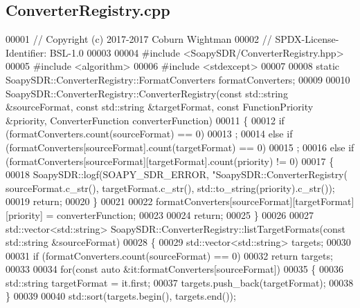 \subsection{Converter\+Registry.\+cpp}
\label{ConverterRegistry_8cpp_source}

\begin{DoxyCode}
00001 \textcolor{comment}{// Copyright (c) 2017-2017 Coburn Wightman}
00002 \textcolor{comment}{// SPDX-License-Identifier: BSL-1.0}
00003 
00004 \textcolor{preprocessor}{#include <SoapySDR/ConverterRegistry.hpp>}
00005 \textcolor{preprocessor}{#include <algorithm>}
00006 \textcolor{preprocessor}{#include <stdexcept>}
00007 
00008 \textcolor{keyword}{static} SoapySDR::ConverterRegistry::FormatConverters formatConverters;
00009 
00010 SoapySDR::ConverterRegistry::ConverterRegistry(\textcolor{keyword}{const} std::string &sourceFormat, \textcolor{keyword}{const} 
      std::string &targetFormat, \textcolor{keyword}{const} FunctionPriority &priority, ConverterFunction converterFunction)
00011 \{
00012   \textcolor{keywordflow}{if} (formatConverters.count(sourceFormat) == 0)
00013     ;
00014   \textcolor{keywordflow}{else} \textcolor{keywordflow}{if} (formatConverters[sourceFormat].count(targetFormat) == 0)
00015     ;
00016   \textcolor{keywordflow}{else} \textcolor{keywordflow}{if} (formatConverters[sourceFormat][targetFormat].count(priority) != 0)
00017     \{
00018       SoapySDR::logf(SOAPY_SDR_ERROR, \textcolor{stringliteral}{"SoapySDR::ConverterRegistry(%
      sourceFormat.c\_str(), targetFormat.c\_str(), std::to\_string(priority).c\_str());
00019       \textcolor{keywordflow}{return};
00020     \}
00021   
00022   formatConverters[sourceFormat][targetFormat][priority] = converterFunction;
00023 
00024   \textcolor{keywordflow}{return};
00025 \}
00026 
00027 std::vector<std::string> SoapySDR::ConverterRegistry::listTargetFormats(\textcolor{keyword}{const} 
      std::string &sourceFormat)
00028 \{
00029   std::vector<std::string> targets;
00030 
00031   \textcolor{keywordflow}{if} (formatConverters.count(sourceFormat) == 0)
00032     \textcolor{keywordflow}{return} targets;
00033 
00034   \textcolor{keywordflow}{for}(\textcolor{keyword}{const} \textcolor{keyword}{auto} &it:formatConverters[sourceFormat])
00035     \{
00036       std::string targetFormat = it.first;
00037       targets.push\_back(targetFormat);
00038     \}
00039   
00040   std::sort(targets.begin(), targets.end());
}
\end{DoxyCode}
